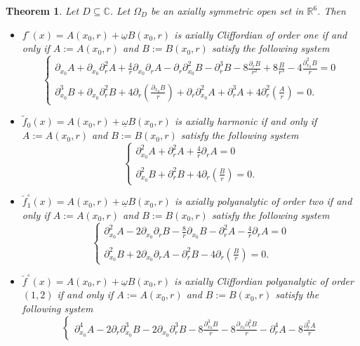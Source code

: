 \documentclass[reqno,11pt]{amsart}
\numberwithin{equation}{section}
\newtheorem{theorem}{Theorem}[section]
\theoremstyle{definition}
\begin{document}
\begin{theorem}
Let $D \subseteq \mathbb{C}$. Let $\Omega_D$ be an axially symmetric open set in $ \mathbb{R}^6$.
 Then
\begin{itemize}
\item $f^{\circ}(x)=A(x_0,r)+ \underline{\omega}B(x_0,r)$ is axially Cliffordian of order one if and only if $A:=A(x_0,r)$ and $B:=B(x_0,r)$ satisfy the following system
$$ \begin{cases}
\partial_{x_0}A+ \partial_{x_0}\partial_{r}^2A + \frac{4}{r} \partial_{x_0}\partial_{r} A- \partial_r \partial_{x_0}^2 B-\partial_r^3 B- 8\frac{ \partial_r B}{r^2}+8\frac{B}{r^3}-4\frac{\partial_{x_0}^2B}{r}=0\\
\\
\partial_{x_0}^3B+ \partial_{x_0}\partial_r^2B+4 \partial_{r} \left( \frac{\partial_{x_0} B}{r}\right)+\partial_r \partial_{x_0}^2 A+ \partial_{r}^3A+4 \partial_{r}^2 \left(\frac{A}{r}\right)=0.
\end{cases}
$$
\item $\tilde{f}_0(x)=A(x_0,r)+ \underline{\omega}B(x_0,r)$ is axially harmonic if and only if $A:=A(x_0,r)$ and $B:=B(x_0,r)$ satisfy the following system
$$
\begin{cases}
\partial_{x_0}^2 A+ \partial_r^2A+ \frac{4}{r} \partial_r A=0\\
\\
\partial_{x_0}^2 B+ \partial_r^2B+ 4 \partial_r \left(\frac{B}{r}\right) =0.
\end{cases}
$$
\item $\breve{f}^{\circ}_1(x)=A(x_0,r)+ \underline{\omega}B(x_0,r)$ is axially polyanalytic of order two if and only if $A:=A(x_0,r)$ and $B:=B(x_0,r)$ satisfy the following system
$$ \begin{cases}
\partial_{x_0}^2 A-2 \partial_{x_0}\partial_r B- \frac{8}{r} \partial_{x_0}B- \partial_r^2A- \frac{4}{r} \partial_r A=0\\
\\
\partial_{x_0}^2 B+2 \partial_{x_0}\partial_r A- \partial_r^2B- 4 \partial_r \left(\frac{B}{r} \right)=0.
\end{cases}
$$
\item $\breve{f}^{\circ}(x)=A(x_0,r)+ \underline{\omega}B(x_0,r)$ is axially Cliffordian  polyanalytic of order $(1,2)$ if and only if $A:=A(x_0,r)$ and $B:=B(x_0,r)$ satisfy the following system
\[
\begin{cases}
\partial_{x_0}^4A-2 \partial_{r} \partial_{x_0}^3B-2 \partial_{x_0} \partial_r^3 B- 8\frac{\partial_{x_0}^3B}{r}- 8\frac{\partial_{x_0}\partial_r^2 B}{r}- \partial_r^4 A-8 \frac{\partial_r^3 A}{r}

\end{cases}\]
\end{itemize}
\end{theorem}
\end{document}
